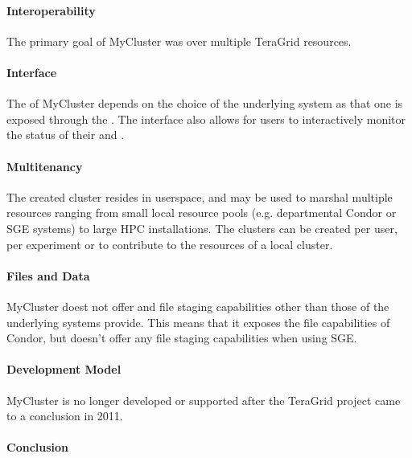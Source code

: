 \documentclass{sig-alternate}
\begin{document}
\paragraph{Interoperability}

The primary goal of MyCluster was  over multiple
TeraGrid resources.

\paragraph{Interface}

The  of MyCluster depends on the choice of the underlying
system as that one is exposed through the . The interface also allows for users to interactively monitor the status
of their \vocab{\pilots} and .

\paragraph{Multitenancy}

The created cluster resides in userspace, and may be used to marshal multiple
resources ranging from small local resource pools (e.g.  departmental Condor or
SGE systems) to large HPC installations. The clusters can be created per user,
per experiment or to contribute to the resources of a local cluster.

\paragraph{Files and Data}

MyCluster doest not offer and file staging capabilities other than those of the
underlying systems provide. This means that it exposes the file capabilities of
Condor, but doesn't offer any file staging capabilities when using SGE.

\paragraph{Development Model}

MyCluster is no longer developed or supported after the TeraGrid project came
to a conclusion in 2011. 

\paragraph{Conclusion}
\end{document}
